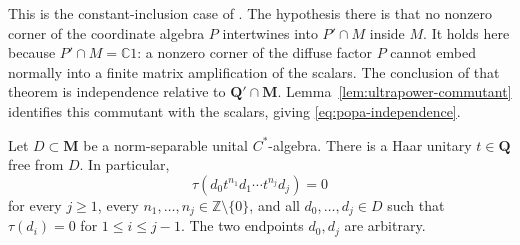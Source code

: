 This is the constant-inclusion case of
\cite[Theorem~0.1(a)]{Popa2014}.  The hypothesis there is that no
nonzero corner of the coordinate algebra $P$ intertwines into
$P'\cap M$ inside $M$.  It holds here because $P'\cap M=\mathbb C1$:
a nonzero corner of the diffuse factor $P$ cannot embed normally
into a finite matrix amplification of the scalars.  The conclusion
of that theorem is independence relative to
$\mathbf Q'\cap\mathbf M$.  Lemma~\ref{lem:ultrapower-commutant}
identifies this commutant with the scalars, giving
\eqref{eq:popa-independence}.

\begin{lemma}
\label{lem:free-haar-extension}
Let $D\subset\mathbf M$ be a norm-separable unital $C^*$-algebra.
There is a Haar unitary $t\in\mathbf Q$ free from $D$.  In
particular,
\begin{equation}
\label{eq:free-endpoints}
  \tau(d_0t^{n_1}d_1\cdots t^{n_j}d_j)=0
\end{equation}
for every $j\geq1$, every $n_1,\ldots,n_j\in\mathbb Z\setminus\{0\}$,
and all $d_0,\ldots,d_j\in D$ such that
$\tau(d_i)=0$ for $1\leq i\leq j-1$.  The two endpoints
$d_0,d_j$ are arbitrary.
\end{lemma}

